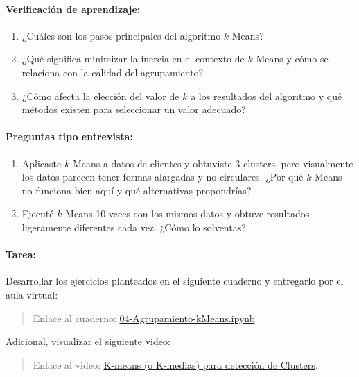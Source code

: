\documentclass[a4,11pt]{aleph-notas}
\begin{document}
\paragraph{Verificación de aprendizaje:} 
\begin{enumerate}[leftmargin=*]
    \item ¿Cuáles son los pasos principales del algoritmo $k$-Means?
    
    \item ¿Qué significa minimizar la inercia en el contexto de $k$-Means y cómo se relaciona con la calidad del agrupamiento?
    
    \item ¿Cómo afecta la elección del valor de $k$ a los resultados del algoritmo y qué métodos existen para seleccionar un valor adecuado?
\end{enumerate}

\paragraph{Preguntas tipo entrevista:} 
\begin{enumerate}[leftmargin=*]
    \item Aplicaste $k$-Means a datos de clientes y obtuviste 3 clusters, pero visualmente los datos parecen tener formas alargadas y no circulares. ¿Por qué $k$-Means no funciona bien aquí y qué alternativas propondrías?
    
    \item Ejecuté $k$-Means 10 veces con los mismos datos y obtuve resultados ligeramente diferentes cada vez. ¿Cómo lo solventas?
\end{enumerate}

\paragraph{Tarea:}
Desarrollar los ejercicios planteados en el siguiente cuaderno y entregarlo por el aula virtual:
\begin{quote}
    Enlace al cuaderno: \href{https://colab.research.google.com/github/andres-merino/AprendizajeAutomaticoInicial-05-N0105/blob/main/2-Ejercicios/04-Agrupamiento-kMeans.ipynb}{04-Agrupamiento-kMeans.ipynb}.
\end{quote}
Adicional, visualizar el siguiente video:
\begin{quote}
    Enlace al video: \href{https://youtu.be/mICySHB0fh4?si=YuMBh5uQs4xyRt5u}{K-means (o K-medias) para detección de Clusters}.
\end{quote}
\end{document}
